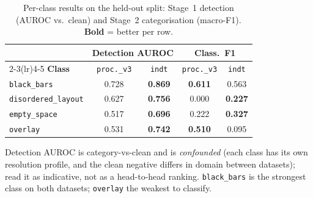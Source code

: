 \begin{table}[t]
\centering
\caption{Per-class results on the held-out split: Stage~1 detection (AUROC vs.\ clean) and
Stage~2 categorisation (macro-F1). \textbf{Bold} = better per row.}
\label{tab:per-class-comparison}
\begin{threeparttable}
\begin{tabular}{l c c c c}
\toprule
 & \multicolumn{2}{c}{\textbf{Detection AUROC}\tnote{a}} & \multicolumn{2}{c}{\textbf{Class.\ F1}} \\
\cmidrule(lr){2-3}\cmidrule(lr){4-5}
\textbf{Class} & \texttt{proc.\_v3} & \texttt{indt} & \texttt{proc.\_v3} & \texttt{indt} \\
\midrule
\texttt{black\_bars}        & 0.728 & \textbf{0.869} & \textbf{0.611} & 0.563 \\
\texttt{disordered\_layout} & 0.627 & \textbf{0.756} & 0.000          & \textbf{0.227} \\
\texttt{empty\_space}       & 0.517 & \textbf{0.696} & 0.222          & \textbf{0.327} \\
\texttt{overlay}            & 0.531 & \textbf{0.742} & \textbf{0.510} & 0.095 \\
\bottomrule
\end{tabular}
\begin{tablenotes}[flush]
\footnotesize
\item[a] Detection AUROC is category-vs-clean and is \emph{confounded} (each class has its own
resolution profile, and the clean negative differs in domain between datasets); read it as
indicative, not as a head-to-head ranking. \texttt{black\_bars} is the strongest class on both
datasets; \texttt{overlay} the weakest to classify.
\end{tablenotes}
\end{threeparttable}
\end{table}
